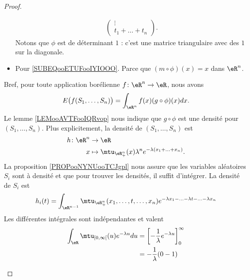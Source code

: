 \begin{proof}
\begin{subproof}
\begin{itemize}
\begin{equation}
\begin{aligned}
\begin{pmatrix}
						                                  \vdots  \\
						                                  t_1+\ldots +t_n
					                                  \end{pmatrix}.
				      \end{aligned}
			      \end{equation}
			      Notons que \( \phi\) est de déterminant \( 1\) : c'est une matrice triangulaire avec des \( 1\) sur la diagonale.
			\item Pour \eqref{SUBEQooETUFooIYIOOO}. Parce que \( (m\circ \phi)(x)=x\) dans \( \eR^n\).
		\end{itemize}
		Bref, pour toute application borélienne \( f\colon \eR^n\to \eR\), nous avons
		\begin{equation}
			E\big( f(S_1,\ldots, S_n) \big)=\int_{\eR^n}f(x)(g\circ \phi)(x)dx.
		\end{equation}
		Le lemme \ref{LEMooAVTFooIQRvop} nous indique que \( g\circ \phi\) est une densité pour \( (S_1,\ldots, S_n)\). Plus explicitement, la densité de \( (S_1,\ldots, S_n)\) est
		\begin{equation}
			\begin{aligned}
				h\colon \eR^n & \to \eR                                                           \\
				x             & \mapsto \mtu_{\eR^n_+}(x)\lambda^n e^{-\lambda(x_1+\ldots +x_n)}.
			\end{aligned}
		\end{equation}
		La proposition \ref{PROPooNYNUooTCJgpl} nous assure que les variables aléatoires \( S_i\) sont à densité et que pour trouver les densités, il suffit d'intégrer. La densité de \( S_i\) est
		\begin{equation}
			h_i(t)=\int_{\eR^{n-1}}\mtu_{\eR^n_+}(x_1,\ldots, t,\ldots, x_n) e^{-\lambda x_1-\ldots -\lambda t-\ldots -\lambda x_n}
		\end{equation}
		Les différentes intégrales sont indépendantes et valent
		\begin{subequations}
			\begin{align}
				\int_{\eR}\mtu_{\mathopen[ 0 , \infty \mathclose[}(u) e^{-\lambda u}du & =\left[ -\frac{1}{ \lambda } e^{-\lambda u} \right]_{0}^{\infty} \\
				                                                                       & =-\frac{1}{ \lambda }(0-1)                                       \\

\end{align}
\end{subequations}
\end{subproof}
\end{proof}
